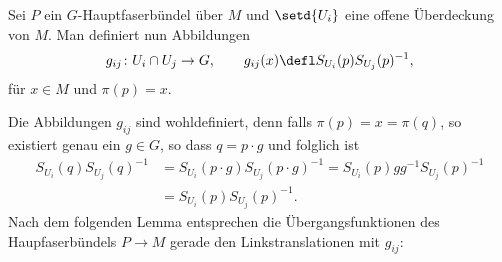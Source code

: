 \documentclass[%
	paper=a5,%
	fleqn,%
	DIV=18,%
	BCOR=0mm,
	fontsize=11pt,
	titlepage=false,%
	bibliography=totoc,
	DIV=18,%
	twoside=true,
	pdftitle=Riemannsche Geometrie,
	pdfauthor=Uwe Semmelmann,
	numbers=noendperiod]%
	{scrbook}
\begin{document}
\begin{defn}
Sei $P$ ein $G$-Hauptfaserbündel über $M$ und $\setd{U_i}$ eine offene
Überdeckung von $M$. Man definiert nun Abbildungen
\begin{align*}
g_{ij} \colon U_i\cap U_j\to G,\qquad g_{ij}(x)\defl S_{U_i}(p)S_{U_j}(p)^{-1},
\end{align*}
für $x\in M$ und $\pi(p)=x$.\fish
\end{defn}

Die Abbildungen $g_{ij}$ sind wohldefiniert, denn falls $\pi(p) = x = \pi(q)$,
so existiert genau ein $g\in G$, so dass $q = p\cdot g$ und folglich ist
\begin{align*}
S_{U_i}(q)S_{U_j}(q)^{-1}
&=
S_{U_i}(p\cdot g)S_{U_j}(p\cdot g)^{-1}
= S_{U_i}(p)gg^{-1}S_{U_j}(p)^{-1}\\
&= S_{U_i}(p)S_{U_j}(p)^{-1}.
\end{align*}
Nach dem folgenden Lemma entsprechen die Übergangsfunktionen des Haupfaserbündels $P \to M$ gerade den
Linkstranslationen mit $g_{ij}$:
\end{document}
